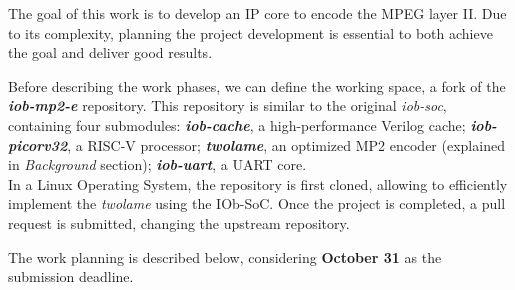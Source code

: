 
The goal of this work is to develop an IP core to encode the MPEG layer II. Due to its complexity, planning the project development is essential to both achieve the goal and deliver good results. 

Before describing the work phases, we can define the working space, a fork of the \textbf{\textit{iob-mp2-e}} repository. 
This repository is similar to the original \textit{iob-soc}, containing four submodules: \textbf{\textit{iob-cache}}, a high-performance Verilog cache; \textbf{\textit{iob-picorv32}}, a RISC-V processor; \textbf{\textit{twolame}}, an optimized MP2 encoder (explained in \textit{Background} section); \textbf{\textit{iob-uart}}, a UART core.\\
In a Linux Operating System, the repository is first cloned, allowing to efficiently implement the \textit{twolame} using the IOb-SoC. Once the project is completed, a pull request is submitted, changing the upstream repository.

The work planning is described below, considering \textbf{October 31} as the submission deadline.

